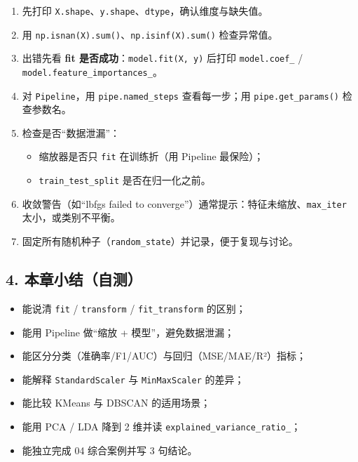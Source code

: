 \begin{enumerate}
\def\labelenumi{\arabic{enumi}.}
\tightlist
\item
  先打印
  \texttt{X.shape}、\texttt{y.shape}、\texttt{dtype}，确认维度与缺失值。
\item
  用 \texttt{np.isnan(X).sum()}、\texttt{np.isinf(X).sum()} 检查异常值。
\item
  出错先看 \textbf{fit 是否成功}：\texttt{model.fit(X,\ y)} 后打印
  \texttt{model.coef\_} / \texttt{model.feature\_importances\_}。
\item
  对 \texttt{Pipeline}，用 \texttt{pipe.named\_steps} 查看每一步；用
  \texttt{pipe.get\_params()} 检查参数名。
\item
  检查是否``数据泄漏''：

  \begin{itemize}
  \tightlist
  \item
    缩放器是否只 \texttt{fit} 在训练折（用 Pipeline 最保险）；
  \item
    \texttt{train\_test\_split} 是否在归一化之前。
  \end{itemize}
\item
  收敛警告（如``lbfgs failed to
  converge''）通常提示：特征未缩放、\texttt{max\_iter}
  太小，或类别不平衡。
\item
  固定所有随机种子（\texttt{random\_state}）并记录，便于复现与讨论。
\end{enumerate}

\subsection{4.
本章小结（自测）}\label{ux672cux7ae0ux5c0fux7ed3ux81eaux6d4b-4}

\begin{itemize}
\tightlist
\item[$\square$]
  能说清 \texttt{fit} / \texttt{transform} / \texttt{fit\_transform}
  的区别；
\item[$\square$]
  能用 Pipeline 做``缩放 + 模型''，避免数据泄漏；
\item[$\square$]
  能区分分类（准确率/F1/AUC）与回归（MSE/MAE/R²）指标；
\item[$\square$]
  能解释 \texttt{StandardScaler} 与 \texttt{MinMaxScaler} 的差异；
\item[$\square$]
  能比较 KMeans 与 DBSCAN 的适用场景；
\item[$\square$]
  能用 PCA / LDA 降到 2 维并读 \texttt{explained\_variance\_ratio\_}；
\item[$\square$]
  能独立完成 04 综合案例并写 3 句结论。
\end{itemize}

